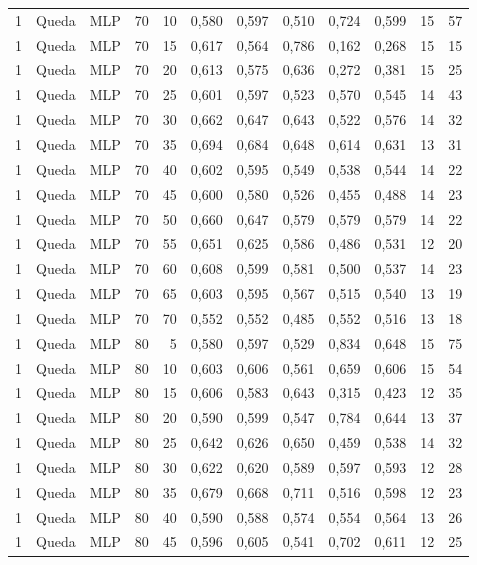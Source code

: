 \begin{longtable}{@{}rllrrrrrrrrr@{}}
1 & Queda & MLP & 70 & 10 & 0,580 & 0,597 & 0,510 & 0,724 & 0,599 & 15 & 57 \\
1 & Queda & MLP & 70 & 15 & 0,617 & 0,564 & 0,786 & 0,162 & 0,268 & 15 & 15 \\
1 & Queda & MLP & 70 & 20 & 0,613 & 0,575 & 0,636 & 0,272 & 0,381 & 15 & 25 \\
1 & Queda & MLP & 70 & 25 & 0,601 & 0,597 & 0,523 & 0,570 & 0,545 & 14 & 43 \\
1 & Queda & MLP & 70 & 30 & 0,662 & 0,647 & 0,643 & 0,522 & 0,576 & 14 & 32 \\
1 & Queda & MLP & 70 & 35 & 0,694 & 0,684 & 0,648 & 0,614 & 0,631 & 13 & 31 \\
1 & Queda & MLP & 70 & 40 & 0,602 & 0,595 & 0,549 & 0,538 & 0,544 & 14 & 22 \\
1 & Queda & MLP & 70 & 45 & 0,600 & 0,580 & 0,526 & 0,455 & 0,488 & 14 & 23 \\
1 & Queda & MLP & 70 & 50 & 0,660 & 0,647 & 0,579 & 0,579 & 0,579 & 14 & 22 \\
1 & Queda & MLP & 70 & 55 & 0,651 & 0,625 & 0,586 & 0,486 & 0,531 & 12 & 20 \\
1 & Queda & MLP & 70 & 60 & 0,608 & 0,599 & 0,581 & 0,500 & 0,537 & 14 & 23 \\
1 & Queda & MLP & 70 & 65 & 0,603 & 0,595 & 0,567 & 0,515 & 0,540 & 13 & 19 \\
1 & Queda & MLP & 70 & 70 & 0,552 & 0,552 & 0,485 & 0,552 & 0,516 & 13 & 18 \\
1 & Queda & MLP & 80 & 5 & 0,580 & 0,597 & 0,529 & 0,834 & 0,648 & 15 & 75 \\
1 & Queda & MLP & 80 & 10 & 0,603 & 0,606 & 0,561 & 0,659 & 0,606 & 15 & 54 \\
1 & Queda & MLP & 80 & 15 & 0,606 & 0,583 & 0,643 & 0,315 & 0,423 & 12 & 35 \\
1 & Queda & MLP & 80 & 20 & 0,590 & 0,599 & 0,547 & 0,784 & 0,644 & 13 & 37 \\
1 & Queda & MLP & 80 & 25 & 0,642 & 0,626 & 0,650 & 0,459 & 0,538 & 14 & 32 \\
1 & Queda & MLP & 80 & 30 & 0,622 & 0,620 & 0,589 & 0,597 & 0,593 & 12 & 28 \\
1 & Queda & MLP & 80 & 35 & 0,679 & 0,668 & 0,711 & 0,516 & 0,598 & 12 & 23 \\
1 & Queda & MLP & 80 & 40 & 0,590 & 0,588 & 0,574 & 0,554 & 0,564 & 13 & 26 \\
1 & Queda & MLP & 80 & 45 & 0,596 & 0,605 & 0,541 & 0,702 & 0,611 & 12 & 25 \\

\end{longtable}
